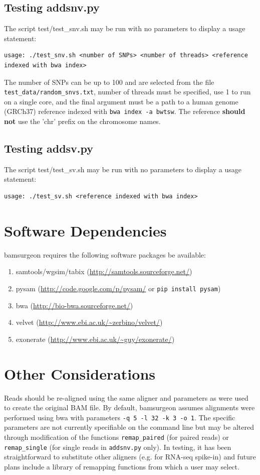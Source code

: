 \documentclass[letterpaper,11pt]{article}
\begin{document}
\subsection{Testing addsnv.py}
The script {test/test\_snv.sh} may be run with no parameters to display a usage statement:
\begin{verbatim}
usage: ./test_snv.sh <number of SNPs> <number of threads> <reference indexed with bwa index>
\end{verbatim}

The number of SNPs can be up to 100 and are selected from the file \texttt{test\_data/random\_snvs.txt}, number of threads must be specified, use 1 to run on a single core, and the final argument must be a path to a human genome (GRCh37) reference indexed with \texttt{bwa index -a bwtsw}. The reference \textbf{should not} use the 'chr' prefix on the chromosome names.

\subsection{Testing addsv.py}
The script {test/test\_sv.sh} may be run with no parameters to display a usage statement:
\begin{verbatim}
usage: ./test_sv.sh <reference indexed with bwa index>
\end{verbatim}

\section{Software Dependencies}
bamsurgeon requires the following software packages be available:

\begin{enumerate}
  \item samtools/wgsim/tabix (\url{http://samtools.sourceforge.net/})
  \item pysam (\url{http://code.google.com/p/pysam/} or \texttt{pip install pysam})
  \item bwa (\url{http://bio-bwa.sourceforge.net/})
  \item velvet (\url{http://www.ebi.ac.uk/~zerbino/velvet/})
  \item exonerate (\url{http://www.ebi.ac.uk/~guy/exonerate/})
\end{enumerate}

\section{Other Considerations}
Reads should be re-aligned using the same aligner and parameters as were used to create the original BAM file. By default, bamsurgeon assumes alignments were performed using bwa with parameters \texttt{-q 5 -l 32 -k 3 -o 1}. The specific parameters are not currently specifiable on the command line but may be altered through modification of the functions \texttt{remap\_paired} (for paired reads) or \texttt{remap\_single} (for single reads in \texttt{addsnv.py} only). In testing, it has been straightforward to substitute other aligners (e.g. for RNA-seq spike-in) and future plans include a library of remapping functions from which a user may select.
\end{document}
